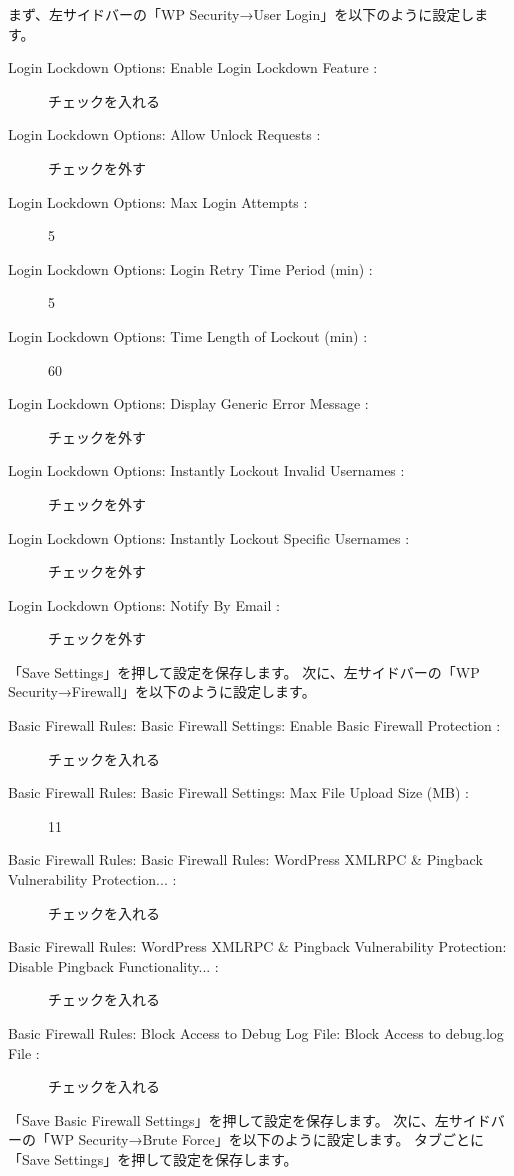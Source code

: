 \documentclass[titlepage,10pt,a4paper,uplatex]{jsbook}
\begin{document}
まず、左サイドバーの「WP Security→User Login」を以下のように設定します。

\begin{description}
\item[Login Lockdown Options: Enable Login Lockdown Feature : ] チェックを入れる
\item[Login Lockdown Options: Allow Unlock Requests : ] チェックを外す
\item[Login Lockdown Options: Max Login Attempts : ] 5
\item[Login Lockdown Options: Login Retry Time Period (min) : ] 5
\item[Login Lockdown Options: Time Length of Lockout (min) : ] 60
\item[Login Lockdown Options: Display Generic Error Message : ] チェックを外す
\item[Login Lockdown Options: Instantly Lockout Invalid Usernames : ] チェックを外す
\item[Login Lockdown Options: Instantly Lockout Specific Usernames : ] チェックを外す
\item[Login Lockdown Options: Notify By Email : ] チェックを外す
\end{description}

「Save Settings」を押して設定を保存します。
次に、左サイドバーの「WP Security→Firewall」を以下のように設定します。

\begin{description}
\item[Basic Firewall Rules: Basic Firewall Settings: Enable Basic Firewall Protection : ] チェックを入れる
\item[Basic Firewall Rules: Basic Firewall Settings: Max File Upload Size (MB) : ] 11
\item[Basic Firewall Rules: Basic Firewall Rules: WordPress XMLRPC \& Pingback Vulnerability Protection... : ] チェックを入れる
\item[Basic Firewall Rules: WordPress XMLRPC \& Pingback Vulnerability Protection: Disable Pingback Functionality... : ] チェックを入れる
\item[Basic Firewall Rules: Block Access to Debug Log File: Block Access to debug.log File : ] チェックを入れる
\end{description}

「Save Basic Firewall Settings」を押して設定を保存します。
次に、左サイドバーの「WP Security→Brute Force」を以下のように設定します。
タブごとに「Save Settings」を押して設定を保存します。
\end{document}
